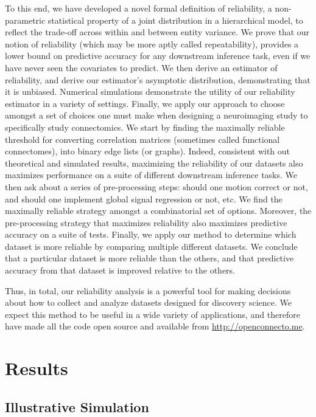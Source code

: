 \documentclass{article}
\begin{document}
To this end,  we have developed a novel formal definition of reliability, 
a non-parametric statistical property of a joint distribution in a hierarchical model, 
to reflect the trade-off across within and between entity variance.  
We prove that our notion of reliability (which may be more aptly called repeatability), provides a lower bound on predictive accuracy for any downstream inference task, even if we have never seen the covariates to predict.
% 
We then derive an estimator of reliability, and derive our estimator's asymptotic distribution, demonstrating that it is unbiased. 
Numerical simulations demonstrate the utility of our reliability estimator in a variety of settings.  Finally, we apply our approach to choose amongst a set of choices one must make when designing a neuroimaging study to specifically study connectomics.  We start by finding the maximally reliable threshold for converting correlation matrices (sometimes called functional connectomes), into binary edge lists (or graphs).  Indeed, consistent with out theoretical and simulated results, maximizing the reliability of our datasets also maximizes performance on a suite of different downstream inference tasks.  We then ask about a series of pre-processing steps: should one motion correct or not, and should one implement global signal regression or not, etc. We find the maximally reliable strategy amongst a combinatorial set of options.  Moreover, the pre-processing strategy that maximizes reliability also maximizes predictive accuracy on a suite of tests.  Finally, we apply our method to determine which dataset is more reliable by comparing multiple different datasets.  We conclude that a particular dataset is more reliable than the others, and that predictive accuracy from that dataset is improved relative to the others. 

Thus, in total, our reliability analysis is a powerful tool for making decisions about how to collect and analyze datasets designed for discovery science.  We expect this method to be useful in a wide variety of applications, and therefore have made all the code open source and available from \url{http://openconnecto.me}.


\section{Results}



\subsection{Illustrative Simulation}
\end{document}
